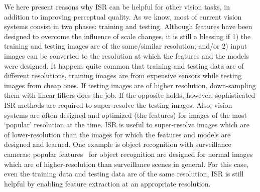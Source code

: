We here present reasons why ISR can be helpful for other vision tasks,
in addition to improving perceptual quality. As we know, most of
current vision systems consist in two phases: training and
testing. Although features have been designed to overcome the
influence of scale changes, it is still a blessing if 1) the training
and testing images are of the same/similar resolution; and/or 2)
input images can be converted to the resolution at which the
features and the models were designed. It happens quite common that
training and testing data are of different resolutions, \eg training
images are from expensive sensors while testing images from cheap
ones. If testing images are of higher resolution, down-sampling them
with linear filters does the job. If the opposite holds, however,
sophisticated ISR methods are required to super-resolve the testing
images. Also, vision systems are often designed and optimized (\eg the
features) for images of the most `popular' resolution at the time. ISR
is useful to super-resolve images which are of lower-resolution than
the images for which the features and models are designed and
learned. One example is object recognition with surveillance cameras:
popular features~\citep{Lowe_SIFT, Dalal_HoG, cnnfeatureoffshelf} for object recognition are designed for normal images
which are of higher-resolution than surveillance scenes in
general. For this case, even the training data and testing data
are of the same resolution, ISR is still helpful by
enabling feature extraction at an appropriate resolution.


